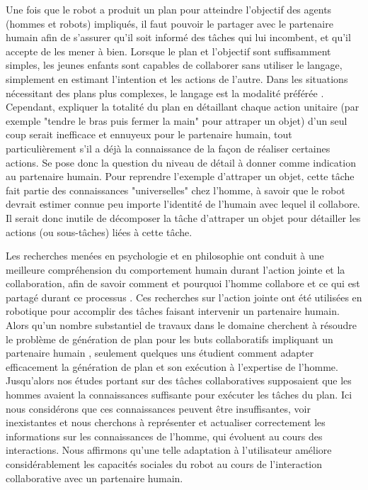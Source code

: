 \documentclass[a4paper,11pt,twoside]{StyleThese}
\begin{document}
Une fois que le robot a produit un plan pour atteindre l'objectif des agents (hommes et robots) impliqués, il faut pouvoir le partager avec le partenaire humain afin de s'assurer qu'il soit informé des tâches qui lui incombent, et qu'il accepte de les mener à bien. Lorsque le plan et l'objectif sont suffisamment simples, les jeunes enfants sont capables de collaborer sans utiliser le langage, simplement en estimant l'intention et les actions de l'autre. Dans les situations nécessitant des plans plus complexes, le langage est la modalité préférée \cite{Warneken2006,Warneken2007}. Cependant, expliquer la totalité du plan en détaillant chaque action unitaire (par exemple "tendre le bras puis fermer la main" pour attraper un objet) d'un seul coup serait inefficace et ennuyeux pour le partenaire humain, tout particulièrement s'il a déjà la connaissance de la façon de réaliser certaines actions. Se pose donc la question du niveau de détail à donner comme indication au partenaire humain. Pour reprendre l'exemple d'attraper un objet, cette tâche fait partie des connaissances "universelles" chez l'homme, à savoir que le robot devrait estimer connue peu importe l'identité de l'humain avec lequel il collabore. Il serait donc inutile de décomposer la tâche d'attraper un objet pour détailler les actions (ou sous-tâches) liées à cette tâche. 

Les recherches menées en psychologie et en philosophie ont conduit à une meilleure compréhension du comportement humain durant l'action jointe et la collaboration, afin de savoir comment \cite{tomasello2005} et pourquoi \cite{tomasello2009} l'homme collabore et ce qui est partagé durant ce processus \cite{Butterfill2011}.
%
%
%
%
Ces recherches sur l'action jointe ont été utilisées en robotique pour accomplir des tâches faisant intervenir un partenaire humain. Alors qu'un nombre substantiel de travaux dans le domaine cherchent à résoudre le problème de génération de plan pour les buts collaboratifs impliquant un partenaire humain \cite{lallement14}, seulement quelques uns étudient comment adapter efficacement la génération de plan et son exécution à l'expertise de l'homme. Jusqu'alors nos études portant sur des tâches collaboratives supposaient que les hommes avaient la connaissances suffisante pour exécuter les tâches du plan. Ici nous considérons que ces connaissances peuvent être insuffisantes, voir inexistantes et nous cherchons à représenter et actualiser correctement les informations sur les connaissances de l'homme, qui évoluent au cours des interactions. Nous affirmons qu'une telle adaptation à l'utilisateur améliore considérablement les capacités sociales du robot au cours de l'interaction collaborative avec un partenaire humain.
\end{document}
